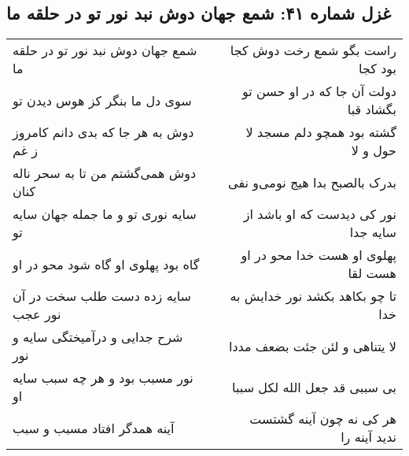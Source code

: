 \begin{center}
\section*{غزل شماره ۴۱: شمع جهان دوش نبد نور تو در حلقه ما}
\label{sec:0041}
\begin{longtable}{l p{0.5cm} r}
شمع جهان دوش نبد نور تو در حلقه ما
&&
راست بگو شمع رخت دوش کجا بود کجا
\\
سوی دل ما بنگر کز هوس دیدن تو
&&
دولت آن جا که در او حسن تو بگشاد قبا
\\
دوش به هر جا که بدی دانم کامروز ز غم
&&
گشته بود همچو دلم مسجد لا حول و لا
\\
دوش همی‌گشتم من تا به سحر ناله کنان
&&
بدرک بالصبح بدا هیج نومی‌و نفی
\\
سایه نوری تو و ما جمله جهان سایه تو
&&
نور کی دیدست که او باشد از سایه جدا
\\
گاه بود پهلوی او گاه شود محو در او
&&
پهلوی او هست خدا محو در او هست لقا
\\
سایه زده دست طلب سخت در آن نور عجب
&&
تا چو بکاهد بکشد نور خدایش به خدا
\\
شرح جدایی و درآمیختگی سایه و نور
&&
لا یتناهی و لئن جئت بضعف مددا
\\
نور مسبب بود و هر چه سبب سایه او
&&
بی سببی قد جعل الله لکل سببا
\\
آینه همدگر افتاد مسبب و سبب
&&
هر کی نه چون آینه گشتست ندید آینه را
\\
\end{longtable}
\end{center}
